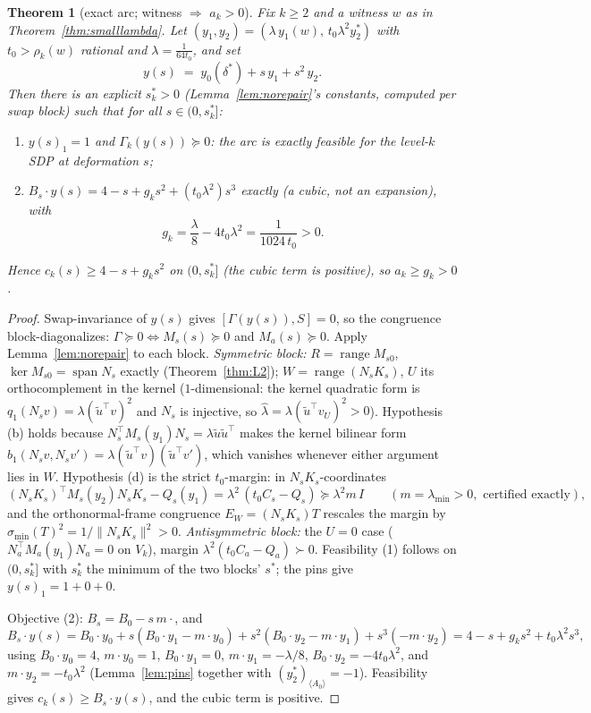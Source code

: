 \documentclass[11pt]{article}
\newtheorem{theorem}{Theorem}[section]
\newcommand{\la}{\langle}
\newcommand{\ra}{\rangle}
\newcommand{\lam}{\lambda}
\DeclareMathOperator{\range}{range}
\DeclareMathOperator{\Span}{span}
\begin{document}
\begin{theorem}[exact arc; witness $\Rightarrow$ $a_k>0$]\label{thm:arc}
Fix $k\ge2$ and a witness $w$ as in Theorem~\ref{thm:smalllambda}. Let
$(y_1,y_2)=(\lam\,y_1(w),\,t_0\lam^2y_2^\ast)$ with $t_0>\rho_k(w)$
rational and $\lam=\tfrac1{64t_0}$, and set
\[
y(s)\;=\;y_0(\delta^\ast)+s\,y_1+s^2\,y_2 .
\]
Then there is an explicit $s^\ast_k>0$ (Lemma~\ref{lem:norepair}'s
constants, computed per swap block) such that for all $s\in(0,s^\ast_k]$:
\begin{enumerate}
\item $y(s)_1=1$ and $\Gamma_k(y(s))\succeq0$: the arc is \emph{exactly}
  feasible for the level-$k$ SDP at deformation $s$;
\item $B_s\cdot y(s)=4-s+g_ks^2+(t_0\lam^2)s^3$ \emph{exactly} (a cubic,
  not an expansion), with
  \[
  g_k=\frac\lam8-4t_0\lam^2=\frac1{1024\,t_0}>0 .
  \]
\end{enumerate}
Hence $c_k(s)\ge4-s+g_ks^2$ on $(0,s^\ast_k]$ (the cubic term is
positive), so $a_k\ge g_k>0$.
\end{theorem}

\begin{proof}
Swap-invariance of $y(s)$ gives $[\Gamma(y(s)),S]=0$, so the congruence
block-diagonalizes: $\Gamma\succeq0\iff M_s(s)\succeq0$ and
$M_a(s)\succeq0$. Apply Lemma~\ref{lem:norepair} to each block.
\emph{Symmetric block:} $R=\range M_{s0}$, $\ker M_{s0}=\Span N_s$
exactly (Theorem~\ref{thm:L2}); $W=\range(N_sK_s)$, $U$ its
orthocomplement in the kernel ($1$-dimensional: the kernel quadratic form
is $q_1(N_sv)=\lam(\tilde u^\top v)^2$ and $N_s$ is injective, so
$\hat\lam=\lam(\tilde u^\top v_U)^2>0$). Hypothesis (b) holds because
$N_s^\top M_s(y_1)N_s=\lam\tilde u\tilde u^\top$ makes the kernel
bilinear form $b_1(N_sv,N_sv')=\lam(\tilde u^\top v)(\tilde u^\top v')$,
which vanishes whenever either argument lies in $W$. Hypothesis (d) is
the strict $t_0$-margin: in $N_sK_s$-coordinates
\[
(N_sK_s)^\top M_s(y_2)N_sK_s-Q_s(y_1)=\lam^2\,(t_0C_s-Q_s)\succeq
\lam^2m\,I\qquad(m=\lambda_{\min}>0,\text{ certified exactly}),
\]
and the orthonormal-frame congruence $E_W=(N_sK_s)T$ rescales the margin
by $\sigma_{\min}(T)^2=1/\|N_sK_s\|^2>0$. \emph{Antisymmetric block:} the
$U=0$ case ($N_a^\top M_a(y_1)N_a=0$ on $V_k$), margin
$\lam^2(t_0C_a-Q_a)\succ0$. Feasibility (1) follows on $(0,s^\ast_k]$
with $s^\ast_k$ the minimum of the two blocks' $s^\ast$; the pins give
$y(s)_1=1+0+0$.

Objective (2): $B_s=B_0-s\,m\cdot$, and
\[
B_s\cdot y(s)=B_0\cdot y_0+s(B_0\cdot y_1-m\cdot y_0)
+s^2(B_0\cdot y_2-m\cdot y_1)+s^3(-m\cdot y_2)
=4-s+g_ks^2+t_0\lam^2s^3,
\]
using $B_0\cdot y_0=4$, $m\cdot y_0=1$, $B_0\cdot y_1=0$,
$m\cdot y_1=-\lam/8$, $B_0\cdot y_2=-4t_0\lam^2$, and
$m\cdot y_2=-t_0\lam^2$ (Lemma~\ref{lem:pins} together with
$(y_2^\ast)_{\la A_0\ra}=-1$). Feasibility gives
$c_k(s)\ge B_s\cdot y(s)$, and the cubic term is positive.
\end{proof}
\end{document}
